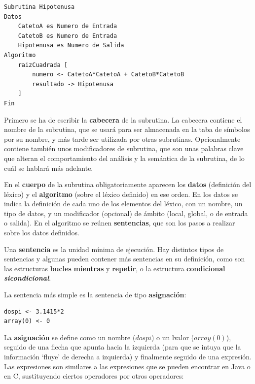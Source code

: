 \documentclass{report}
\begin{document}
\begin{BVerbatim}
Subrutina Hipotenusa
Datos
	CatetoA es Numero de Entrada
	CatetoB es Numero de Entrada
	Hipotenusa es Numero de Salida
Algoritmo
	raizCuadrada [
		numero <- CatetoA*CatetoA + CatetoB*CatetoB
		resultado -> Hipotenusa
	]
Fin
\end{BVerbatim}

	\vspace{10px}
	
	Primero se ha de escribir la \textbf{cabecera} de la subrutina. La cabecera contiene el nombre de la subrutina, que se usará para ser almacenada en la taba de símbolos por su nombre, y más tarde ser utilizada por otras subrutinas. Opcionalmente contiene también unos modificadores de subrutina, que son unas palabras clave que alteran el comportamiento del análisis y la semántica de la subrutina, de lo cuál se hablará más adelante.
	
	\vspace{10px}
	
	En el \textbf{cuerpo} de la subrutina obligatoriamente aparecen los \textbf{datos} (definición del léxico) y el \textbf{algoritmo} (sobre el léxico definido) en ese orden. En los datos se indica la definición de cada uno de los elementos del léxico, con un nombre, un tipo de datos, y un modificador (opcional) de ámbito (local, global, o de entrada o salida). En el algoritmo se reúnen \textbf{sentencias}, que son los pasos a realizar sobre los datos definidos.  
	
	\vspace{10px}
	
	Una \textbf{sentencia} es la unidad mínima de ejecución. Hay distintos tipos de sentencias y algunas pueden contener más sentencias en su definición, como son las estructuras \textbf{bucles} \textbf{mientras} y \textbf{repetir}, o la estructura \textbf{condicional} \textbf{\textit{sicondicional}}. 
	
	\vspace{10px}
	
	La sentencia más simple es la sentencia de tipo \textbf{asignación}:
	
	\vspace{10px}
	
\begin{BVerbatim}
dospi <- 3.1415*2
array(0) <- 0
\end{BVerbatim}
	
	\vspace{10px}
	
	La \textbf{asignación} se define como un nombre ($dospi$) o un lvalor ($array(0)$), seguido de una flecha que apunta hacia la izquierda (para que se intuya que la información `fluye' de derecha a izquierda) y finalmente seguido de una expresión. Las expresiones son similares a las expresiones que se pueden encontrar en Java o en C, sustituyendo ciertos operadores por otros operadores:
	
\end{document}
